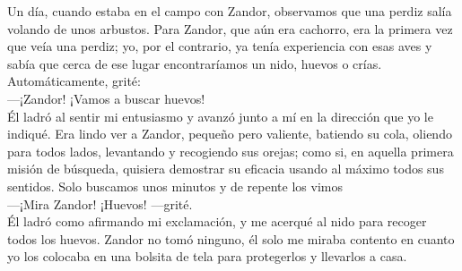 Un día, cuando estaba en el campo con Zandor, observamos que una perdiz salía volando de unos arbustos. 
Para Zandor, que aún era cachorro, era la primera vez que veía una perdiz; 
yo, por el contrario, ya tenía experiencia con esas aves y sabía que cerca de ese lugar encontraríamos un nido, huevos o crías.
Automáticamente, grité:\\\indent
---¡Zandor! ¡Vamos a buscar huevos!\\\indent
Él ladró al sentir mi entusiasmo y avanzó junto a mí en la dirección que yo le indiqué.
Era lindo ver a Zandor, pequeño pero valiente, batiendo su cola, oliendo para todos lados, levantando y recogiendo sus orejas; como si, en aquella primera misión de búsqueda, quisiera demostrar su eficacia usando al máximo todos sus sentidos.
Solo buscamos unos minutos y de repente los vimos\\\indent
---¡Mira Zandor! ¡Huevos! ---grité.\\\indent
Él ladró como afirmando mi exclamación, y me acerqué al nido para recoger todos los huevos. Zandor no tomó ninguno, él solo me miraba contento en cuanto yo los colocaba en una bolsita de tela para protegerlos y llevarlos a casa.

